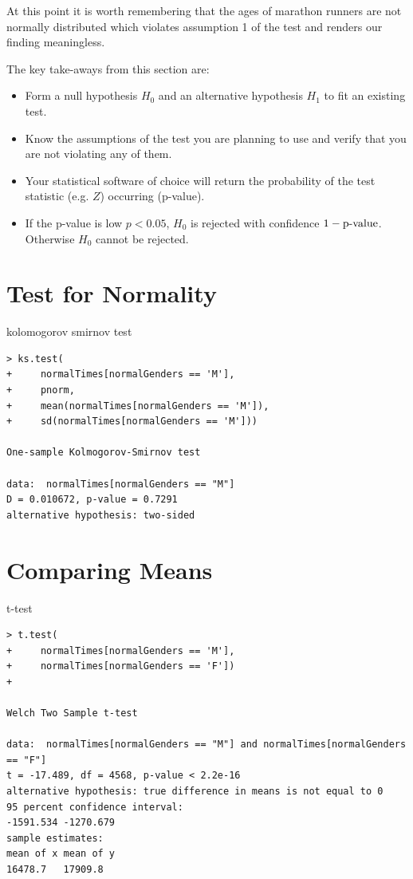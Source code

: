 \documentclass{tufte-book} %
\begin{document}
At this point it is worth remembering that the ages of marathon runners are not normally distributed which violates assumption 1 of the test and renders our finding meaningless.

\begin{tcolorbox}
	The key take-aways from this section are:
	\begin{itemize}
		\item Form a null hypothesis $H_0$ and an alternative hypothesis $H_1$ to fit an existing test.
		\item Know the assumptions of the test you are planning to use and verify that you are not violating any of them.
		\item Your statistical software of choice will return the probability of the test statistic (e.g. $Z$) occurring (p-value).
		\item If the p-value is low $p<0.05$, $H_0$ is rejected with confidence $1 - \hbox{p-value}$. Otherwise $H_0$ cannot be rejected.
	\end{itemize}
\end{tcolorbox}

\section{Test for Normality}
kolomogorov smirnov test \cite{kanji2006}

\begin{Verbatim}
> ks.test(
+     normalTimes[normalGenders == 'M'], 
+     pnorm, 
+     mean(normalTimes[normalGenders == 'M']), 
+     sd(normalTimes[normalGenders == 'M']))

One-sample Kolmogorov-Smirnov test

data:  normalTimes[normalGenders == "M"]
D = 0.010672, p-value = 0.7291
alternative hypothesis: two-sided
\end{Verbatim}

\section{Comparing Means}
t-test
\begin{Verbatim}
> t.test(
+     normalTimes[normalGenders == 'M'], 
+     normalTimes[normalGenders == 'F'])
+ 

Welch Two Sample t-test

data:  normalTimes[normalGenders == "M"] and normalTimes[normalGenders == "F"]
t = -17.489, df = 4568, p-value < 2.2e-16
alternative hypothesis: true difference in means is not equal to 0
95 percent confidence interval:
-1591.534 -1270.679
sample estimates:
mean of x mean of y 
16478.7   17909.8 
\end{Verbatim}
\end{document}
